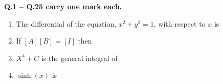 \documentclass[journal]{IEEEtran}
\begin{document}
\newpage
\noindent \textbf{Q.1 -- Q.25 carry one mark each.}
\begin{enumerate}
\item The differential of the equation, $x^2 + y^2 = 1$, with respect to $x$ is
  \begin{enumerate}
  \end{enumerate}
  \hfill{}
\item If $[A][B] = [I]$ then
  \begin{enumerate}
  \end{enumerate}
  \hfill{}
\item $X^4 + C$ is the general integral of
  \begin{enumerate}
  \end{enumerate}
  \hfill{}



\item $\sinh(x)$ is
  \begin{enumerate}
  \end{enumerate}
  \hfill{}
  

\end{enumerate}
\end{document}
